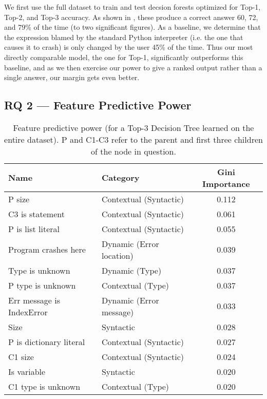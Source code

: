\documentclass[conference]{IEEEtran}
\begin{document}
We first use the full dataset to train and test decsion forests optimized for
Top-1, Top-2, and Top-3 accuracy. As shown in ,
these produce a correct answer 60, 72, and
79\% of the time (to two significant figures). As a baseline, we determine that
the expression blamed by the standard Python interpreter (i.e. the one that
causes it to crash) is only changed by the user 45\% of the time. Thus our
most directly comparable model, the one for Top-1, significantly outperforms
this baseline, and as we then exercise our power to give a ranked output rather
than a single answer, our margin gets even better.


\subsection{RQ 2 --- Feature Predictive Power}

\begin{table}[]
\begin{tabular}{llc}
Name                      & Category                & Gini Importance \\ \bottomrule
P size                    & Contextual (Syntactic)  & 0.112 \\
C3 is statement           & Contextual (Syntactic)  & 0.061 \\
P is list literal         & Contextual (Syntactic)  & 0.055 \\
Program crashes here      & Dynamic (Error location)& 0.039 \\
Type is unknown           & Dynamic (Type)          & 0.037 \\
P type is unknown         & Contextual (Type)       & 0.037 \\
Err message is IndexError & Dynamic (Error message) & 0.033 \\
Size                      & Syntactic               & 0.028 \\
P is dictionary literal   & Contextual (Syntactic)  & 0.027 \\
C1 size                   & Contextual (Syntactic)  & 0.024 \\
Is variable               & Syntactic               & 0.020 \\
C1 type is unknown        & Contextual (Type)       & 0.020 \\
\toprule
\end{tabular}
\caption{Feature predictive power (for a Top-3 Decision Tree
learned on the entire dataset). P and C1-C3 refer to the parent and
first three children of the node in question.}
\label{tab-feature-predictive-power}
\end{table}
\end{document}
